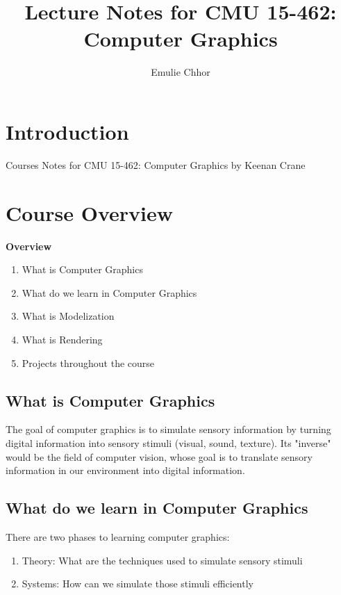 \documentclass{article}
\begin{document}
\title{Lecture Notes for CMU 15-462: Computer Graphics}
\author{Emulie Chhor}
\maketitle

\section{Introduction}

Courses Notes for CMU 15-462: Computer Graphics by Keenan Crane

\section{Course Overview}

\textbf{Overview}

\begin{enumerate}
    \item What is Computer Graphics
    \item What do we learn in Computer Graphics
    \item What is Modelization
    \item What is Rendering
    \item Projects throughout the course
\end{enumerate}

\subsection{What is Computer Graphics}

The goal of computer graphics is to simulate sensory information by
turning digital information into sensory stimuli (visual, sound, texture).
Its "inverse" would be the field of computer vision, whose goal is to
translate sensory information in our environment into digital information.

\subsection{What do we learn in Computer Graphics}

There are two phases to learning computer graphics:
\begin{enumerate}
    \item Theory: What are the techniques used to simulate sensory stimuli
    \item Systems: How can we simulate those stimuli efficiently
\end{enumerate}
\end{document}
